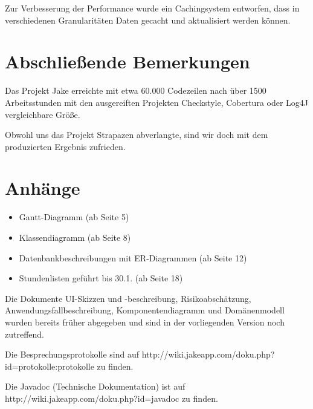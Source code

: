 Zur Verbesserung der Performance wurde ein Cachingsystem entworfen, dass in verschiedenen Granularitäten Daten gecacht und aktualisiert werden können.


\section{Abschließende Bemerkungen}
Das Projekt Jake erreichte mit etwa 60.000 Codezeilen nach über 1500 Arbeitsstunden mit den ausgereiften Projekten Checkstyle, Cobertura oder Log4J vergleichbare Größe.

Obwohl uns das Projekt Strapazen abverlangte, sind wir doch mit dem produzierten Ergebnis zufrieden.

\section{Anhänge}
\begin{itemize}
\item Gantt-Diagramm (ab Seite 5)
\item Klassendiagramm (ab Seite 8)
\item Datenbankbeschreibungen mit ER-Diagrammen (ab Seite 12)
\item Stundenlisten geführt bis 30.1. (ab Seite 18)
\end{itemize}

Die Dokumente UI-Skizzen und -beschreibung, Risikoabschätzung,
Anwendungsfallbeschreibung, Komponentendiagramm und Domänenmodell wurden bereits
früher abgegeben und sind in der vorliegenden Version noch zutreffend.

Die Besprechungsprotokolle sind auf http://wiki.jakeapp.com/doku.php?id=protokolle:protokolle zu finden.

Die Javadoc (Technische Dokumentation) ist auf http://wiki.jakeapp.com/doku.php?id=javadoc zu finden.

